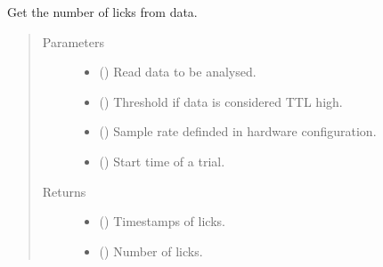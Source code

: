 \documentclass[letterpaper,10pt,english]{sphinxmanual}
\begin{document}
\begin{fulllineitems}
\label{\detokenize{NoSeMazeControl/TrialLogic:TrialLogic.TrialConditions.licks_number}}
\pysigstartsignatures
{}
\pysigstopsignatures
\sphinxAtStartPar
Get the number of licks from data.
\begin{quote}\begin{description}
\item[{Parameters}] \leavevmode\begin{itemize}
\item {} 
\sphinxAtStartPar
{} () \textendash{} Read data to be analysed.

\item {} 
\sphinxAtStartPar
{} () \textendash{} Threshold if data is considered TTL high.

\item {} 
\sphinxAtStartPar
{} () \textendash{} Sample rate definded in hardware configuration.

\item {} 
\sphinxAtStartPar
{} () \textendash{} Start time of a trial.

\end{itemize}

\item[{Returns}] \leavevmode
\sphinxAtStartPar
\begin{itemize}
\item {} 
\sphinxAtStartPar
{} () \textendash{} Timestamps of licks.

\item {} 
\sphinxAtStartPar
{} () \textendash{} Number of licks.

\end{itemize}


\end{description}\end{quote}

\end{fulllineitems}
\end{document}
